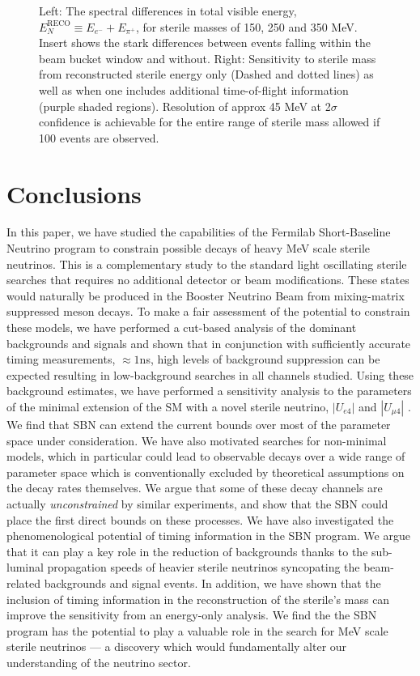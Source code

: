 \documentclass[11pt, a4paper]{article}
\begin{document}
\begin{figure}[t]
\caption{\label{fig:tof_scatter}Left: The spectral differences in total visible
energy, $E_N^\text{RECO} \equiv E_{e^-}+E_{\pi^+}$, for sterile masses of 150,
250 and 350 MeV. Insert shows the stark differences between events falling
within the beam bucket window and without.  Right: Sensitivity to sterile mass
from reconstructed sterile energy only (Dashed and dotted lines) as well as
when one includes additional time-of-flight information (purple shaded
regions). Resolution of approx 45 MeV at 2$\sigma$ confidence is achievable for
the entire range of sterile mass allowed if 100 events are observed. }

\end{figure}



\section{\label{sec:conclusions}Conclusions}

In this paper, we have studied the capabilities of the Fermilab Short-Baseline
Neutrino program to constrain possible decays of heavy MeV scale sterile
neutrinos. This is a complementary study to the standard light oscillating
sterile searches that requires no additional detector or beam modifications.
These states would naturally be produced in the Booster Neutrino Beam from
mixing-matrix suppressed meson decays. To make a fair assessment of the
potential to constrain these models, we have performed a cut-based analysis of
the dominant backgrounds and signals and shown that in conjunction with
sufficiently accurate timing measurements, $\approx 1$ns, high levels of
background suppression can be expected resulting in low-background searches in
all channels studied. Using these background estimates, we have performed a
sensitivity analysis to the parameters of the minimal extension of the SM with
a novel sterile neutrino, $|U_{e4}|$ and $|U_{\mu4}|$ . 
%
We find that SBN can extend the current bounds over most of the parameter space
under consideration. 
%
We have also motivated searches for non-minimal models, which in particular
could lead to observable decays over a wide range of parameter space which is
conventionally excluded by theoretical assumptions on the decay rates
themselves. We argue that some of these decay channels are actually
\emph{unconstrained} by similar experiments, and show that the SBN could place
the first direct bounds on these processes.
%
We have also investigated the phenomenological potential of timing information
in the SBN program. We argue that it can play a key role in the reduction of
backgrounds thanks to the sub-luminal propagation speeds of heavier sterile
neutrinos syncopating the beam-related backgrounds and signal events. In
addition, we have shown that the inclusion of timing information in the
reconstruction of the sterile's mass can improve the sensitivity from an
energy-only analysis. 
%
We find the the SBN program has the potential to play a valuable role in the
search for MeV scale sterile neutrinos --- a discovery which would
fundamentally alter our understanding of the neutrino sector.
\end{document}
